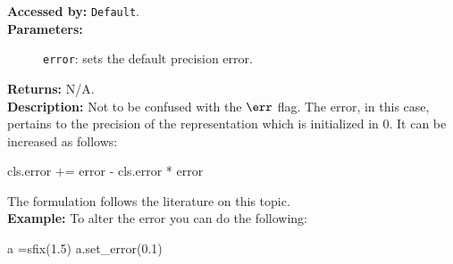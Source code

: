 \begin{mylisting}
			\textbf{Accessed by:} \verb|Default|.		 \\
			\textbf{Parameters:}
			\begin{description}
				\item[]\verb|error|:  sets the default precision error. 
			\end{description}
			\textbf{Returns:} N/A. \\
			\textbf{Description:} Not to be confused with the 
$\err$ flag. The error, in this case, pertains to the precision of the representation which is initialized in 0. It can be increased as follows:
			\begin{mylisting}							
					cls.error += error - cls.error * error
			\end{mylisting}
			The formulation follows the literature on this topic. \\
			\textbf{Example:}      
			To alter the error you can do the following:
			\begin{mylisting}
				a =sfix(1.5)
				a.set_error(0.1)
			\end{mylisting}
		

\end{mylisting}

